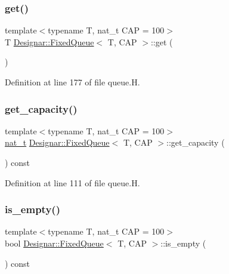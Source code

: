 \subsubsection{\texorpdfstring{get()}{get()}}
{\footnotesize\ttfamily template$<$typename T, nat\+\_\+t C\+AP = 100$>$ \\
T \hyperlink{class_designar_1_1_fixed_queue}{Designar\+::\+Fixed\+Queue}$<$ T, C\+AP $>$\+::get (\begin{DoxyParamCaption}{ }\end{DoxyParamCaption})\hspace{0.3cm}{\ttfamily [inline]}}



Definition at line 177 of file queue.\+H.

\mbox{\label{class_designar_1_1_fixed_queue_a786767a9a56c0c4b1e93631b509f0fa1}} 
\subsubsection{\texorpdfstring{get\+\_\+capacity()}{get\_capacity()}}
{\footnotesize\ttfamily template$<$typename T, nat\+\_\+t C\+AP = 100$>$ \\
\hyperlink{namespace_designar_aa72662848b9f4815e7bf31a7cf3e33d1}{nat\+\_\+t} \hyperlink{class_designar_1_1_fixed_queue}{Designar\+::\+Fixed\+Queue}$<$ T, C\+AP $>$\+::get\+\_\+capacity (\begin{DoxyParamCaption}{ }\end{DoxyParamCaption}) const\hspace{0.3cm}{\ttfamily [inline]}}



Definition at line 111 of file queue.\+H.

\mbox{\label{class_designar_1_1_fixed_queue_aa72d9c9dd2ce251b6d29b31c04ee6517}} 
\subsubsection{\texorpdfstring{is\+\_\+empty()}{is\_empty()}}
{\footnotesize\ttfamily template$<$typename T, nat\+\_\+t C\+AP = 100$>$ \\
bool \hyperlink{class_designar_1_1_fixed_queue}{Designar\+::\+Fixed\+Queue}$<$ T, C\+AP $>$\+::is\+\_\+empty (\begin{DoxyParamCaption}{ }\end{DoxyParamCaption}) const\hspace{0.3cm}{\ttfamily [inline]}}



